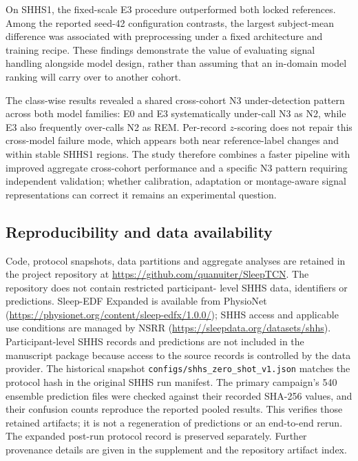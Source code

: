 \documentclass[11pt,a4paper]{article}
\begin{document}
On SHHS1, the fixed-scale E3 procedure outperformed both locked references. Among the reported seed-42
configuration contrasts, the largest subject-mean difference was associated with preprocessing under
a fixed architecture and training recipe.
These findings demonstrate the value of evaluating signal handling alongside model design, rather than
assuming that an in-domain model ranking will carry over to another cohort.

The class-wise results revealed a shared cross-cohort N3 under-detection pattern across both model
families: E0 and E3 systematically under-call N3 as N2, while E3 also frequently over-calls N2 as REM.
Per-record $z$-scoring does not repair this cross-model failure mode, which appears both near reference-label
changes and within stable SHHS1 regions. The study therefore combines a faster pipeline with improved
aggregate cross-cohort performance and a specific N3 pattern requiring independent validation; whether
calibration, adaptation or montage-aware signal representations can correct it remains an experimental
question.

\subsection*{Reproducibility and data availability}

Code, protocol snapshots, data partitions and aggregate analyses are retained in the project repository
at \url{https://github.com/quanuiter/SleepTCN}. The repository does not contain restricted participant-
level SHHS data, identifiers or predictions.
Sleep-EDF Expanded is available from PhysioNet
(\url{https://physionet.org/content/sleep-edfx/1.0.0/}); SHHS access and applicable use conditions are
managed by NSRR (\url{https://sleepdata.org/datasets/shhs}). Participant-level SHHS records and
predictions are not included in the manuscript package because access to the source records is controlled
by the data provider. The historical snapshot
\texttt{configs/shhs\_zero\_shot\_v1.json} matches the protocol hash in the original SHHS run manifest.
The primary campaign's 540 ensemble prediction files were checked against their recorded SHA-256 values,
and their confusion counts reproduce the reported pooled results. This verifies those retained artifacts;
it is not a regeneration of predictions or an end-to-end rerun. The expanded post-run protocol record
is preserved separately. Further provenance details are given in the supplement and the repository
artifact index.
\end{document}
